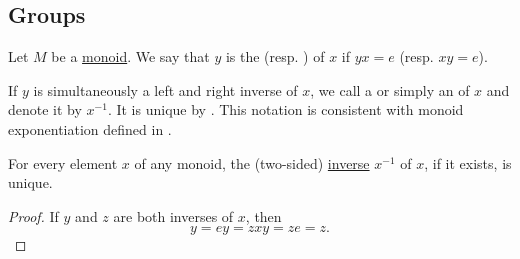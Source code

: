 \subsection{Groups}\label{subsec:groups}

\begin{definition}\label{def:monoid_inverse}
  Let \( M \) be a \hyperref[def:monoid]{monoid}. We say that \( y \) is the  (resp. ) of \( x \) if \( yx = e \) (resp. \( xy = e \)).

  If \( y \) is simultaneously a left and right inverse of \( x \), we call a  or simply an  of \( x \) and denote it by \( x^{-1} \). It is unique by . This notation is consistent with monoid exponentiation defined in .
\end{definition}

\begin{proposition}\label{def:monoid_inverse_unique}
  For every element \( x \) of any monoid, the (two-sided) \hyperref[def:monoid_inverse]{inverse} \( x^{-1} \) of \( x \), if it exists, is unique.
\end{proposition}
\begin{proof}
  If \( y \) and \( z \) are both inverses of \( x \), then
  \begin{equation*}
    y = ey = zxy = ze = z.
  \end{equation*}
\end{proof}

